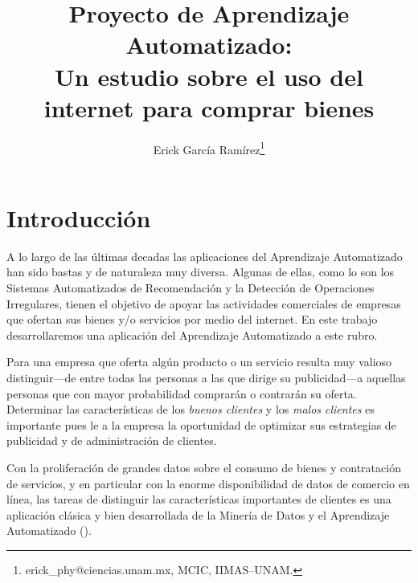 \documentclass[letterpaper,11pt]{article}
\begin{document}
\title{Proyecto de Aprendizaje Automatizado:\\
{\Large Un estudio sobre el uso del internet para comprar bienes}}
\author{Erick García Ramírez\footnote{
erick\_phy@ciencias.unam.mx, MCIC, IIMAS--UNAM.}}

\maketitle
\begin{abstract}
\noindent 
\end{abstract}


\section{Introducción}
A lo largo de las últimas decadas las aplicaciones del Aprendizaje Automatizado han sido bastas y de
naturaleza muy diversa. Algunas de ellas, como lo son los Sistemas Automatizados de Recomendación y la Detección de
Operaciones Irregulares, tienen el objetivo de apoyar las actividades comerciales de empresas que ofertan
sus bienes y/o servicios por medio del internet. En este trabajo desarrollaremos una aplicación del Aprendizaje
Automatizado a este rubro.

Para una empresa que oferta algún producto o un servicio resulta muy valioso distinguir---de entre todas
las personas a las que dirige su publicidad---a aquellas personas que con mayor probabilidad comprarán o
contrarán su oferta. Determinar las características de los \emph{buenos clientes} y los \emph{malos clientes} es importante pues 
le a la empresa la oportunidad de optimizar sus estrategias de publicidad y de administración de clientes. 

Con la proliferación de grandes datos sobre el consumo de bienes y contratación de servicios, y en particular con la enorme
disponibilidad de datos de comercio en línea, las tareas de distinguir las características importantes de clientes es
una aplicación clásica y bien desarrollada de la Minería de Datos y el Aprendizaje Automatizado (\cite[Capítulo I]{berry}).  
\end{document}
